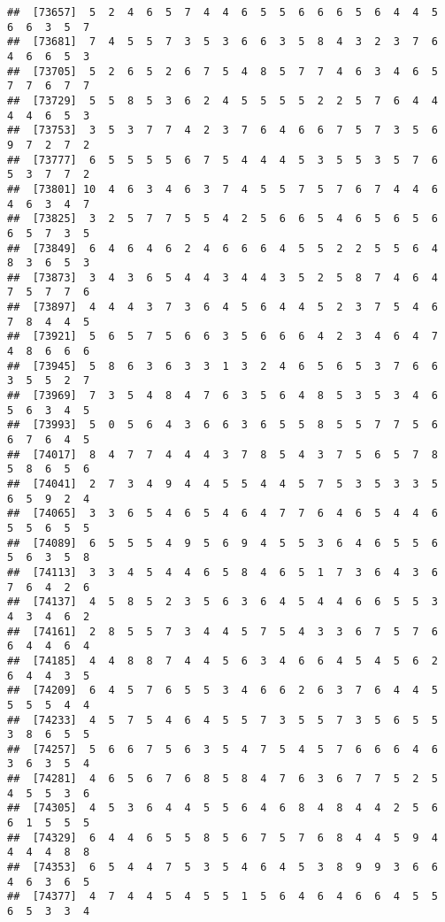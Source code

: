 \documentclass[
]{book}
\begin{document}
\begin{verbatim}
##  [73657]  5  2  4  6  5  7  4  4  6  5  5  6  6  6  5  6  4  4  5  6  6  3  5  7
##  [73681]  7  4  5  5  7  3  5  3  6  6  3  5  8  4  3  2  3  7  6  4  6  6  5  3
##  [73705]  5  2  6  5  2  6  7  5  4  8  5  7  7  4  6  3  4  6  5  7  7  6  7  7
##  [73729]  5  5  8  5  3  6  2  4  5  5  5  5  2  2  5  7  6  4  4  4  4  6  5  3
##  [73753]  3  5  3  7  7  4  2  3  7  6  4  6  6  7  5  7  3  5  6  9  7  2  7  2
##  [73777]  6  5  5  5  5  6  7  5  4  4  4  5  3  5  5  3  5  7  6  5  3  7  7  2
##  [73801] 10  4  6  3  4  6  3  7  4  5  5  7  5  7  6  7  4  4  6  4  6  3  4  7
##  [73825]  3  2  5  7  7  5  5  4  2  5  6  6  5  4  6  5  6  5  6  6  5  7  3  5
##  [73849]  6  4  6  4  6  2  4  6  6  6  4  5  5  2  2  5  5  6  4  8  3  6  5  3
##  [73873]  3  4  3  6  5  4  4  3  4  4  3  5  2  5  8  7  4  6  4  7  5  7  7  6
##  [73897]  4  4  4  3  7  3  6  4  5  6  4  4  5  2  3  7  5  4  6  7  8  4  4  5
##  [73921]  5  6  5  7  5  6  6  3  5  6  6  6  4  2  3  4  6  4  7  4  8  6  6  6
##  [73945]  5  8  6  3  6  3  3  1  3  2  4  6  5  6  5  3  7  6  6  3  5  5  2  7
##  [73969]  7  3  5  4  8  4  7  6  3  5  6  4  8  5  3  5  3  4  6  5  6  3  4  5
##  [73993]  5  0  5  6  4  3  6  6  3  6  5  5  8  5  5  7  7  5  6  6  7  6  4  5
##  [74017]  8  4  7  7  4  4  4  3  7  8  5  4  3  7  5  6  5  7  8  5  8  6  5  6
##  [74041]  2  7  3  4  9  4  4  5  5  4  4  5  7  5  3  5  3  3  5  6  5  9  2  4
##  [74065]  3  3  6  5  4  6  5  4  6  4  7  7  6  4  6  5  4  4  6  5  5  6  5  5
##  [74089]  6  5  5  5  4  9  5  6  9  4  5  5  3  6  4  6  5  5  6  5  6  3  5  8
##  [74113]  3  3  4  5  4  4  6  5  8  4  6  5  1  7  3  6  4  3  6  7  6  4  2  6
##  [74137]  4  5  8  5  2  3  5  6  3  6  4  5  4  4  6  6  5  5  3  4  3  4  6  2
##  [74161]  2  8  5  5  7  3  4  4  5  7  5  4  3  3  6  7  5  7  6  6  4  4  6  4
##  [74185]  4  4  8  8  7  4  4  5  6  3  4  6  6  4  5  4  5  6  2  6  4  4  3  5
##  [74209]  6  4  5  7  6  5  5  3  4  6  6  2  6  3  7  6  4  4  5  5  5  5  4  4
##  [74233]  4  5  7  5  4  6  4  5  5  7  3  5  5  7  3  5  6  5  5  3  8  6  5  5
##  [74257]  5  6  6  7  5  6  3  5  4  7  5  4  5  7  6  6  6  4  6  3  6  3  5  4
##  [74281]  4  6  5  6  7  6  8  5  8  4  7  6  3  6  7  7  5  2  5  4  5  5  3  6
##  [74305]  4  5  3  6  4  4  5  5  6  4  6  8  4  8  4  4  2  5  6  6  1  5  5  5
##  [74329]  6  4  4  6  5  5  8  5  6  7  5  7  6  8  4  4  5  9  4  4  4  4  8  8
##  [74353]  6  5  4  4  7  5  3  5  4  6  4  5  3  8  9  9  3  6  6  4  6  3  6  5
##  [74377]  4  7  4  4  5  4  5  5  1  5  6  4  6  4  6  6  4  5  5  6  5  3  3  4

\end{verbatim}
\end{document}
